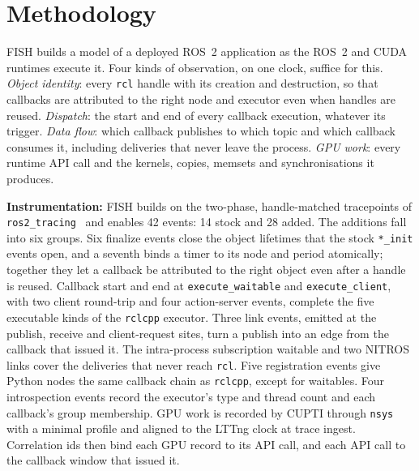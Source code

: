 
\section{Methodology}
\label{sec:method}

FISH builds a model of a deployed ROS~2 application as the ROS~2 and CUDA
runtimes execute it. Four kinds of observation, on one clock, suffice for this.
\emph{Object identity}: every \texttt{rcl} handle with its creation and
destruction, so that callbacks are attributed to the right node and executor
even when handles are reused. \emph{Dispatch}: the start and end of every
callback execution, whatever its trigger. \emph{Data flow}: which callback
publishes to which topic and which callback consumes it, including deliveries
that never leave the process. \emph{GPU work}: every runtime API call and the
kernels, copies, memsets and synchronisations it produces.

\noindent
\textbf{Instrumentation:}
FISH builds on the two-phase, handle-matched tracepoints of
\texttt{ros2\_tracing}~\cite{bedard-2022-ros2tracing} and enables 42 events: 14
stock and 28 added. The additions fall into six groups. Six finalize events
close the object lifetimes that the stock \texttt{*\_init} events open, and a
seventh binds a timer to its node and period atomically; together they let a
callback be attributed to the right object even after a handle is reused.
Callback start and end at \texttt{execute\_waitable} and
\texttt{execute\_client}, with two client round-trip and four action-server
events, complete the five executable kinds of the \texttt{rclcpp} executor.
Three link events, emitted at the publish, receive and client-request sites,
turn a publish into an edge from the callback that issued it. The intra-process
subscription waitable and two NITROS links cover the deliveries that never reach
\texttt{rcl}. Five registration events give Python nodes the same callback chain
as \texttt{rclcpp}, except for waitables. Four introspection events record the
executor's type and thread count and each callback's group membership. GPU work
is recorded by CUPTI through \texttt{nsys} with a minimal profile and aligned to
the LTTng clock at trace ingest. Correlation ids then bind each GPU record to
its API call, and each API call to the callback window that issued it.

